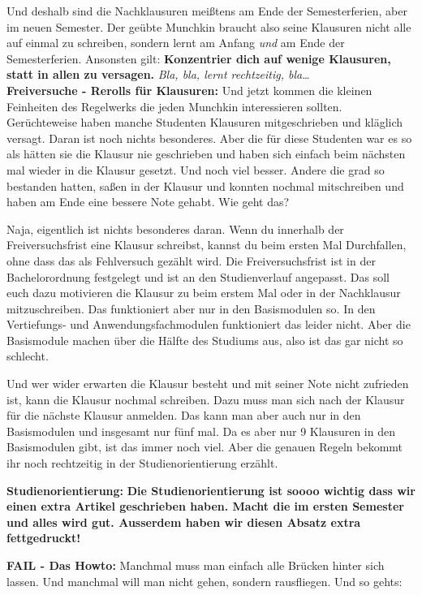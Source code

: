 Und deshalb sind die Nachklausuren mei{\ss}tens am Ende der Semesterferien, aber im neuen Semester. Der
ge\"ubte Munchkin braucht also seine Klausuren nicht alle auf einmal zu
schreiben, sondern lernt am Anfang \emph{und} am Ende der Semesterferien.
Ansonsten gilt: \textbf{Konzentrier dich auf wenige Klausuren, statt in allen zu versagen.}
\emph{Bla, bla, lernt rechtzeitig, bla\dots}\\

\textbf{Freiversuche - Rerolls f\"ur Klausuren:}
Und jetzt kommen die kleinen Feinheiten des Regelwerks die jeden Munchkin interessieren sollten.
Ger\"uchteweise haben manche Studenten Klausuren mitgeschrieben und kl\"aglich versagt. Daran ist noch nichts besonderes.
Aber die f\"ur diese Studenten war es so als h\"atten sie die Klausur nie
geschrieben und haben sich einfach beim n\"achsten mal wieder in die Klausur
gesetzt. Und noch viel besser. Andere die grad so bestanden hatten, sa{\ss}en
in der Klausur und konnten nochmal mitschreiben und haben am Ende eine bessere
Note gehabt. Wie geht das?

Naja, eigentlich ist nichts besonderes daran. Wenn du innerhalb der
Freiversuchsfrist eine Klausur schreibst, kannst du beim ersten Mal
Durchfallen, ohne dass das als Fehlversuch gez\"ahlt wird.
Die Freiversuchsfrist ist in der Bachelorordnung festgelegt und ist an den Studienverlauf angepasst.
Das soll euch dazu motivieren die Klausur zu beim erstem Mal oder in der Nachklausur mitzuschreiben.
Das funktioniert aber nur in den Basismodulen so. In den Vertiefungs- und Anwendungsfachmodulen funktioniert das leider nicht.
Aber die Basismodule machen \"uber die H\"alfte des Studiums aus, also ist das gar nicht so schlecht.

Und wer wider erwarten die Klausur besteht und mit seiner Note nicht zufrieden
ist, kann die Klausur nochmal schreiben. Dazu muss man sich nach der Klausur
f\"ur die n\"achste Klausur anmelden. Das kann man aber auch nur in den
Basismodulen und insgesamt nur f\"unf mal. Da es aber nur 9 Klausuren in den Basismodulen gibt,
ist das immer noch viel. Aber die genauen Regeln bekommt ihr noch rechtzeitig in der Studienorientierung erz\"ahlt.

\textbf{Studienorientierung:}
\textbf{
Die Studienorientierung ist soooo wichtig dass wir einen extra Artikel geschrieben haben. Macht die im ersten Semester und alles wird gut. Ausserdem haben wir diesen Absatz extra fettgedruckt!}

\textbf{FAIL - Das Howto:}
Manchmal muss man einfach alle Br\"ucken hinter sich lassen. Und manchmal will man nicht gehen, sondern rausfliegen. Und so gehts:

